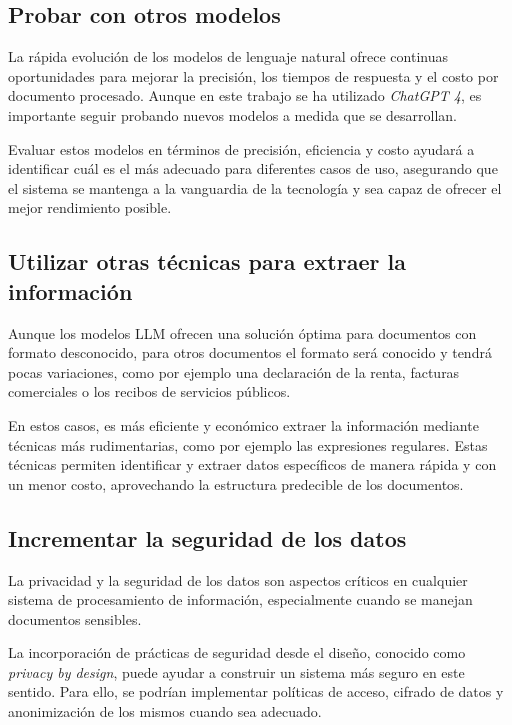 \subsection*{Probar con otros modelos}

La rápida evolución de los modelos de lenguaje natural ofrece continuas oportunidades para mejorar la precisión, los
tiempos de respuesta y el costo por documento procesado.
Aunque en este trabajo se ha utilizado \textit{ChatGPT 4}, es importante seguir probando nuevos modelos a medida que se
desarrollan.

Evaluar estos modelos en términos de precisión, eficiencia y costo ayudará a identificar cuál es el más adecuado para
diferentes casos de uso, asegurando que el sistema se mantenga a la vanguardia de la tecnología y sea capaz de ofrecer
el mejor rendimiento posible.

\subsection*{Utilizar otras técnicas para extraer la información}

Aunque los modelos LLM ofrecen una solución óptima para documentos con formato desconocido, para otros documentos el
formato será conocido y tendrá pocas variaciones, como por ejemplo una declaración de la renta, facturas comerciales o
los recibos de servicios públicos.

En estos casos, es más eficiente y económico extraer la información mediante técnicas más rudimentarias, como por
ejemplo las expresiones regulares.
Estas técnicas permiten identificar y extraer datos específicos de manera rápida y con un menor costo, aprovechando la
estructura predecible de los documentos.

\subsection*{Incrementar la seguridad de los datos}

La privacidad y la seguridad de los datos son aspectos críticos en cualquier sistema de procesamiento de información,
especialmente cuando se manejan documentos sensibles.

La incorporación de prácticas de seguridad desde el diseño, conocido como \textit{privacy by design}, puede ayudar a
construir un sistema más seguro en este sentido.
Para ello, se podrían implementar políticas de acceso, cifrado de datos y anonimización de los mismos cuando sea
adecuado.

